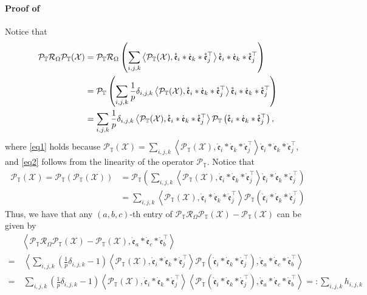 \documentclass[twoside,12pt]{article}
\def\dme{{\dot{\mathfrak{e}}}}
\def\mrme{{\mathring{\mathfrak{e}}}}
\begin{document}
\paragraph{Proof of }
Notice that
\begin{align}
\mathcal{P}_{\mathbb{T}} \mathcal{R}_{\Omega} \mathcal{P}_{\mathbb{T}}(\mathcal{X})&= \mathcal{P}_{\mathbb{T}} \mathcal{R}_{\Omega} \left(\sum\limits_{i,j,k}\left\langle\mathcal{P}_{\mathbb{T}}(\mathcal{X}),\mrme_i * \dme_k * \mrme_j^{\top}\right\rangle \mrme_i * \dme_k * \mrme_j^{\top}\right)\label{eq1} \\
&= \mathcal{P}_{\mathbb{T}} \left(\sum\limits_{i,j,k}\frac{1}{p} \delta_{i, j, k} \left\langle\mathcal{P}_{\mathbb{T}}(\mathcal{X}),\mrme_i * \dme_k * \mrme_j^{\top}\right\rangle \mrme_i * \dme_k * \mrme_j^{\top}\right) \notag\\
&= \sum\limits_{i,j,k}\frac{1}{p} \delta_{i, j, k} \left\langle\mathcal{P}_{\mathbb{T}}(\mathcal{X}),\mrme_i * \dme_k * \mrme_j^{\top}\right\rangle \mathcal{P}_{\mathbb{T}} \left(\mrme_i * \dme_k * \mrme_j^{\top}\right)\label{eq2},
\end{align}
where \eqref{eq1} holds because $\mathcal{P}_{\mathbb{T}}( \mathcal{X}) = \sum\limits_{i,j,k}\left\langle\mathcal{P}_{\mathbb{T}}(\mathcal{X}),\mrme_i * \dme_k * \mrme_j^{\top}\right\rangle \mrme_i * \dme_k * \mrme_j^{\top}$, and \eqref{eq2}  follows from the linearity of the operator $\mathcal{P}_{\mathbb{T}}$.
Notice that 
\begin{align*}
    \mathcal{P}_{\mathbb{T}}(\mathcal{X})  = \mathcal{P}_{\mathbb{T}}\left(\mathcal{P}_{\mathbb{T}}(\mathcal{X})\right) 
&=\mathcal{P}_{\mathbb{T}}\left(\sum\limits_{i,j,k}\left\langle\mathcal{P}_{\mathbb{T}}(\mathcal{X}),\mrme_i * \dme_k * \mrme_j^{\top}\right\rangle \mrme_i * \dme_k * \mrme_j^{\top}\right)\\
&=\sum\limits_{i,j,k}\left\langle\mathcal{P}_{\mathbb{T}}(\mathcal{X}),\mrme_i * \dme_k * \mrme_j^{\top}\right\rangle \mathcal{P}_{\mathbb{T}}\left(\mrme_i * \dme_k * \mrme_j^{\top}\right)
\end{align*}
Thus, we  have that  any $(a,b,c)$-th entry of $\mathcal{P}_{\mathbb{T}} \mathcal{R}_{\Omega} \mathcal{P}_{\mathbb{T}}(\mathcal{X})-\mathcal{P}_{\mathbb{T}}(\mathcal{X})$ can be given by 
\begin{align*}
&\left\langle\mathcal{P}_{\mathbb{T}} \mathcal{R}_{\Omega} \mathcal{P}_{\mathbb{T}}(\mathcal{X})-\mathcal{P}_{\mathbb{T}}(\mathcal{X}), \mrme_a*\dme_c*\mrme_b^{\top}\right\rangle \\
=&~\left\langle\sum\limits_{i, j, k} (\frac{1}{p} \delta_{i, j, k}-1)\left\langle\mathcal{P}_{\mathbb{T}}(\mathcal{X}),\mrme_i * \dme_k * \mrme_j^{\top}\right\rangle\mathcal{P}_{\mathbb{T}}\left(\mrme_i * \dme_k * \mrme_j^{\top}\right),\mrme_a * \dme_c * \mrme_b^{\top}\right\rangle \\
=&~\sum_{i, j, k} (\frac{1}{p} \delta_{i, j, k}-1)\left\langle\mathcal{P}_{\mathbb{T}}(\mathcal{X}),\mrme_i * \dme_k * \mrme_j^{\top}\right\rangle\left\langle\mathcal{P}_{\mathbb{T}}\left(\mrme_i * \dme_k * \mrme_j^{\top}\right),\mrme_a * \dme_c * \mrme_b^{\top}\right\rangle 
=: \sum\limits_{i,j,k}h_{i,j,k}
\end{align*} 
\end{document}
